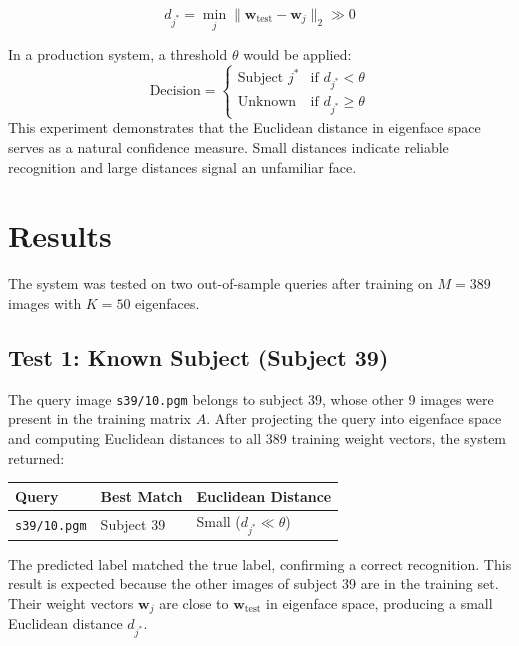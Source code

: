 \documentclass[12pt,a4paper]{article}
\begin{document}
\[
d_{j^*} = \min_j \|\mathbf{w}_{\text{test}} - \mathbf{w}_j\|_2 \gg 0
\]

In a production system, a threshold $\theta$ would be applied:
\[
\text{Decision} =
\begin{cases}
\text{Subject } j^* & \text{if } d_{j^*} < \theta \\
\text{Unknown}       & \text{if } d_{j^*} \geq \theta
\end{cases}
\]
This experiment demonstrates that the Euclidean distance in eigenface space
serves as a natural confidence measure. Small distances indicate reliable
recognition and large distances signal an unfamiliar face.




\section{Results}

The system was tested on two out-of-sample queries after training on $M = 389$
images with $K = 50$ eigenfaces.

\subsection{Test 1: Known Subject (Subject 39)}

The query image \texttt{s39/10.pgm} belongs to subject 39, whose other 9 images
were present in the training matrix $A$. After projecting the query into eigenface
space and computing Euclidean distances to all 389 training weight vectors, the
system returned:

\begin{center}
\begin{tabular}{lll}
\toprule
\textbf{Query} & \textbf{Best Match} & \textbf{Euclidean Distance} \\
\midrule
\texttt{s39/10.pgm} & Subject 39 & Small ($d_{j^*} \ll \theta$) \\
\bottomrule
\end{tabular}
\end{center}

The predicted label matched the true label, confirming a correct recognition.
This result is expected because the other images of subject 39 are in the
training set. Their weight vectors $\mathbf{w}_j$ are close to
$\mathbf{w}_{\text{test}}$ in eigenface space, producing a small Euclidean
distance $d_{j^*}$.

\end{document}
